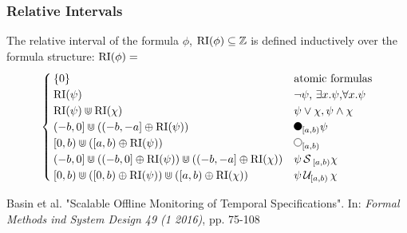 \begin{frame}
    \frametitle{Relative Intervals}
    \begin{definition} 
        \label{def:rel-int}
        The relative interval of the formula $\phi$, $\operatorname{RI}(\phi) \subseteq \mathbb{Z}$ is defined inductively over the formula structure: 
        $\operatorname{RI}(\phi) =$
        \begin{equation*}
            \begin{cases}
                \{0\}     & \text{atomic formulas} \\ 
                \RI(\psi) & \text{$\neg \psi$, 
                                    $\exists x.\psi$,} \forall x.\psi \\
                \RI(\psi) \Cup \RI(\chi) & \text{$\psi \lor \chi, 
                                                \psi \land \chi$} \\
                (-b,0] \Cup ((-b,-a] \oplus \RI(\psi)) & \text{$\Previous{[a,b)}\psi$} \\
                [0,b) \Cup ([a,b) \oplus \RI(\psi)) & \text{$\Next{[a,b)}$}\\
                (-b,0] \Cup ((-b,0] \oplus \RI(\psi)) \Cup ((-b,-a] \oplus \RI(\chi)) & \text{$\psi \Since{}_{[a,b)} \chi$} \\
                [0,b) \Cup ([0,b) \oplus \RI(\psi)) \Cup ([a,b) \oplus \RI(\chi)) & \text{$\psi \Until{[a,b)} \chi$} \\
            \end{cases}
        \end{equation*}
    \end{definition}
    {\footnotesize
    Basin et al. "Scalable Offline Monitoring of Temporal Specifications". In: \textit{Formal Methods ind System Design 49 (1 2016)}, pp. 75-108
    }
\end{frame}

